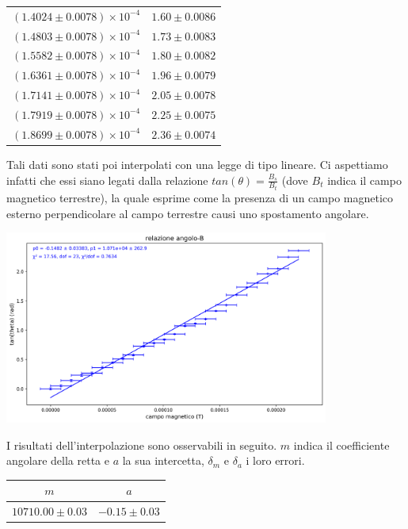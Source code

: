 \documentclass[a4paper]{article}
\begin{document}
\begin{center}
\begin{tabular}{|c|c|}
$(1.4024 \pm 0.0078) \times 10^{-4}$ & $1.60 \pm 0.0086$ \\
$(1.4803 \pm 0.0078) \times 10^{-4}$ & $1.73 \pm 0.0083$ \\
$(1.5582 \pm 0.0078) \times 10^{-4}$ & $1.80 \pm 0.0082$ \\
$(1.6361 \pm 0.0078) \times 10^{-4}$ & $1.96 \pm 0.0079$ \\
$(1.7141 \pm 0.0078) \times 10^{-4}$ & $2.05 \pm 0.0078$ \\
$(1.7919 \pm 0.0078) \times 10^{-4}$ & $2.25 \pm 0.0075$ \\
$(1.8699 \pm 0.0078) \times 10^{-4}$ & $2.36 \pm 0.0074$ \\
\hline
\end{tabular}
\end{center}

Tali dati sono stati poi interpolati con una legge di tipo lineare.
Ci aspettiamo infatti che essi siano legati dalla relazione \( tan(\theta) = \frac {B_s}{B_t} \) (dove \( \mathit{B_t} \) indica il campo magnetico terrestre),
la quale esprime come la presenza di un campo magnetico esterno perpendicolare al campo terrestre causi uno spostamento angolare.

\begin{center}
    \includegraphics[width=0.8\textwidth]{grafici/campo_magnetico.png}
\end{center}
I risultati dell'interpolazione sono osservabili in seguito. \( \mathit{m} \) indica il coefficiente angolare della retta e \( \mathit{a} \) la sua intercetta,
\( \mathit{\delta_m} \) e \( \mathit{\delta_a} \) i loro errori.

\begin{center}
\begin{tabular}{|c|c|}
\hline
$m$ & $a$ \\
\hline
$10710.00 \pm 0.03$ & $-0.15 \pm 0.03$ \\
\hline
\end{tabular}
\end{center}
\end{document}
